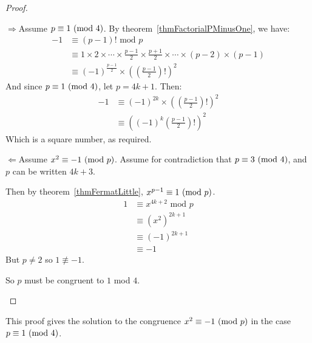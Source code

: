 \documentclass[../Main.tex]{subfiles}
\begin{document}
\begin{proof}
    \begin{proofdirection}{$\Rightarrow$}{Assume $p \equiv 1~(\text{mod}~{4})$.}
        By theorem~\ref{thmFactorialPMinusOne}, we have:
        \begin{align*}
            -1 &\equiv (p-1)! \text{ mod } p \\
            &\equiv 1 \times 2 \times \cdots \times \frac{p-1}{2} \times \frac{p+1}{2} \times \cdots \times (p-2) \times (p-1) \\
            &\equiv (-1)^{\frac{p-1}{2}} \times \left(\left(\frac{p-1}{2}\right)!\right)^2
        \end{align*}
        And since $p \equiv 1~(\text{mod}~{4})$, let $p = 4k + 1$. Then:
        \begin{align*}
            -1 &\equiv (-1)^{2k} \times \left(\left(\frac{p-1}{2}\right)!\right)^2 \\
            &\equiv \left((-1)^k \left(\frac{p-1}{2}\right)!\right)^2
        \end{align*}
        Which is a square number, as required.
    \end{proofdirection}
    \begin{proofdirection}{$\Leftarrow$}{Assume $x^2 \equiv -1~(\text{mod}~{p})$.}
        Assume for contradiction that $p \equiv 3~(\text{mod}~{4})$, and $p$ can be written $4k + 3$.\par
        Then by theorem~\ref{thmFermatLittle}, $x^{p-1} \equiv 1~(\text{mod}~{p})$.
        \begin{align*}
            1 &\equiv x^{4k+2} \text{ mod } p \\
            &\equiv \left(x^2\right)^{2k+1} \\
            &\equiv (-1)^{2k+1} \\
            &\equiv -1
        \end{align*}
        But $p \neq 2$ so $1 \not\equiv -1$. \contradiction\par
        So $p$ must be congruent to $1$ mod $4$.
    \end{proofdirection}
\end{proof}
\begin{remark}
    This proof gives the solution to the congruence $x^2 \equiv -1~(\text{mod}~{p})$ in the case $p \equiv 1~(\text{mod}~{4})$.
\end{remark}
\end{document}

